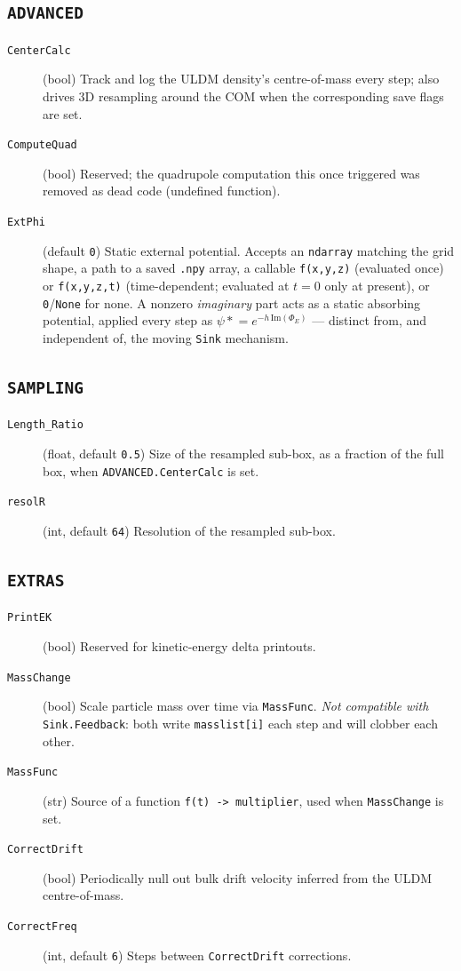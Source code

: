 \documentclass[11pt]{article}
\newcommand{\code}[1]{\texttt{#1}}
\newcommand{\field}[1]{\texttt{#1}}
\begin{document}
\subsection{\field{ADVANCED}}
\begin{description}
  \item[\field{CenterCalc}] (bool) Track and log the ULDM density's
    centre-of-mass every step; also drives 3D resampling around the COM when
    the corresponding save flags are set.
  \item[\field{ComputeQuad}] (bool) Reserved; the quadrupole computation this
    once triggered was removed as dead code (undefined function).
  \item[\field{ExtPhi}] (default \code{0}) Static external potential. Accepts
    an \code{ndarray} matching the grid shape, a path to a saved \code{.npy}
    array, a callable \code{f(x,y,z)} (evaluated once) or \code{f(x,y,z,t)}
    (time-dependent; evaluated at $t=0$ only at present), or \code{0}/\code{None}
    for none. A nonzero \emph{imaginary} part acts as a static absorbing
    potential, applied every step as $\psi \mathrel{*}= e^{-h\,\mathrm{Im}(\Phi_E)}$
    --- distinct from, and independent of, the moving \field{Sink} mechanism.
\end{description}

\subsection{\field{SAMPLING}}
\begin{description}
  \item[\field{Length\_Ratio}] (float, default \code{0.5}) Size of the
    resampled sub-box, as a fraction of the full box, when
    \field{ADVANCED.CenterCalc} is set.
  \item[\field{resolR}] (int, default \code{64}) Resolution of the resampled
    sub-box.
\end{description}

\subsection{\field{EXTRAS}}
\begin{description}
  \item[\field{PrintEK}] (bool) Reserved for kinetic-energy delta printouts.
  \item[\field{MassChange}] (bool) Scale particle mass over time via
    \field{MassFunc}. \emph{Not compatible with} \field{Sink.Feedback}: both
    write \code{masslist[i]} each step and will clobber each other.
  \item[\field{MassFunc}] (str) Source of a function \code{f(t) -> multiplier},
    used when \field{MassChange} is set.
  \item[\field{CorrectDrift}] (bool) Periodically null out bulk drift velocity
    inferred from the ULDM centre-of-mass.
  \item[\field{CorrectFreq}] (int, default \code{6}) Steps between
    \field{CorrectDrift} corrections.
\end{description}
\end{document}
